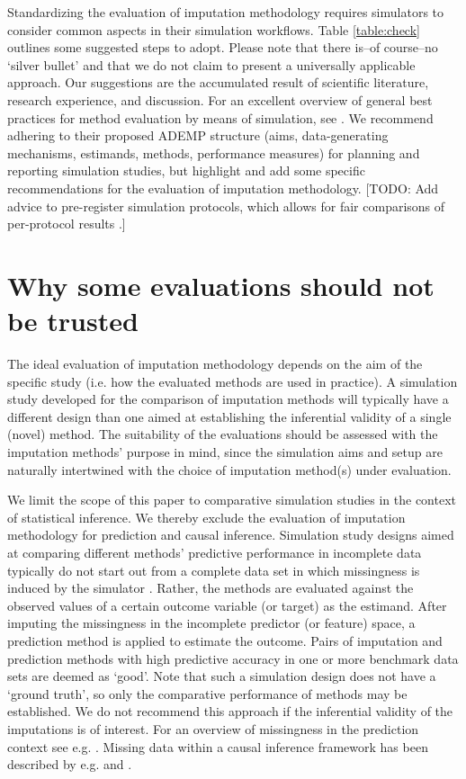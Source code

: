 \documentclass[bimj,fleqn]{w-art}
\begin{document}
Standardizing the evaluation of imputation methodology requires simulators to consider common aspects in their simulation workflows. Table \ref{table:check} outlines some suggested steps to adopt. Please note that there is--of course--no `silver bullet' and that we do not claim to present a universally applicable approach. Our suggestions are the accumulated result of scientific literature, research experience, and discussion. For an excellent overview of general best practices for method evaluation by means of simulation, see \citet{morr18}. We recommend adhering to their proposed ADEMP structure (aims, data-generating mechanisms, estimands, methods, performance measures) for planning and reporting simulation studies, but highlight and add some specific recommendations for the evaluation of imputation methodology. [TODO: Add advice to pre-register simulation protocols, which allows for fair comparisons of per-protocol results \citep{pawe22}.]


\section{Why some evaluations should not be trusted}


The ideal evaluation of imputation methodology depends on the aim of the specific study (i.e. how the evaluated methods are used in practice). A simulation study developed for the comparison of imputation methods will typically have a different design than one aimed at establishing the inferential validity of a single (novel) method. The suitability of the evaluations should be assessed with the imputation methods' purpose in mind, since the simulation aims and setup are naturally intertwined with the choice of imputation method(s) under evaluation.

We limit the scope of this paper to comparative simulation studies in the context of statistical inference. We thereby exclude the evaluation of imputation methodology for prediction and causal inference. Simulation study designs aimed at comparing different methods' predictive performance in incomplete data typically do not start out from a complete data set in which missingness is induced by the simulator \citep{liu21}. Rather, the methods are evaluated against the observed values of a certain outcome variable (or target) as the estimand. After imputing the missingness in the incomplete predictor (or feature) space, a prediction method is applied to estimate the outcome. Pairs of imputation and prediction methods with high predictive accuracy in one or more benchmark data sets are deemed as `good'. Note that such a simulation design does not have a `ground truth', so only the comparative performance of methods may be established. We do not recommend this approach if the inferential validity of the imputations is of interest. For an overview of missingness in the prediction context see e.g. \citet{sper20}. Missing data within a causal inference framework has been described by e.g. \cite{more18} and \cite{moha21}.
\end{document}
